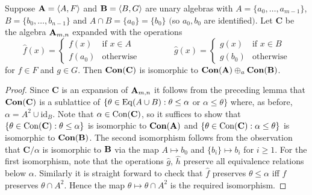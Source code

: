 
\begin{theorem}
  Suppose $\mathbf{A}=\langle A,F\rangle$ and $\mathbf{B}=\langle B,G\rangle$ are unary algebras with
  $A=\{a_0,\dots,a_{m-1}\}$, $B=\{b_0,\dots,b_{n-1}\}$ and 
  $A\cap B=\{a_0\}=\{b_0\}$ $($so $a_0,b_0$ are identified$)$. Let $\mathbf C$ be the
  algebra $\mathbf{A}_{m,n}$ expanded with the operations 
  $$
  \hat f(x)=\begin{cases}f(x)&\text{if $x\in A$}\\
  f(a_0)&\text{otherwise}\end{cases}\qquad\qquad
  \hat g(x)=\begin{cases}g(x)&\text{if $x\in B$}\\
  g(b_0)&\text{otherwise}\end{cases}
  $$
  for $f\in F$ and $g\in G$. Then $\mathbf{Con}(\mathbf C)$ is isomorphic to
  $\mathbf{Con}(\mathbf{A})\oplus_a\mathbf{Con}(\mathbf{B})$. 
\end{theorem}

\begin{proof}
  Since $\mathbf C$ is an expansion of $\mathbf{A}_{m,n}$ it follows from the preceding lemma
  that $\mathbf{Con}(\mathbf C)$ is a sublattice of 
  $\{\theta\in \operatorname{Eq}(A\cup B):\theta\le\alpha$ or $\alpha\le\theta\}$ where,
  as before, $\alpha=A^2\cup\text{id}_B$. Note that $\alpha\in\operatorname{Con}(\mathbf C)$,
  so it suffices to show that $\{\theta\in\operatorname{Con}(\mathbf C):\theta\le\alpha\}$ is
  isomorphic to $\mathbf{Con}(\mathbf{A})$ and $\{\theta\in\operatorname{Con}(\mathbf C):\alpha\le\theta\}$ 
  is isomorphic to $\mathbf{Con}(\mathbf{B})$. The second isomorphism follows from the
  observation that $\mathbf C/\alpha$ is isomorphic to $\mathbf{B}$ via the map 
  $A\mapsto b_0$ and $\{b_i\}\mapsto b_i$ for $i\ge 1$. For the first isomorphism,
  note that the operations $\hat g$, $\hat h$ preserve all equivalence relations
  below $\alpha$. Similarly it is straight forward to check that $\hat f$
  preserves $\theta\le\alpha$ iff $f$ preserves $\theta\cap A^2$. 
  Hence the map $\theta\mapsto\theta\cap A^2$ is the required isomorphism.
\end{proof}


